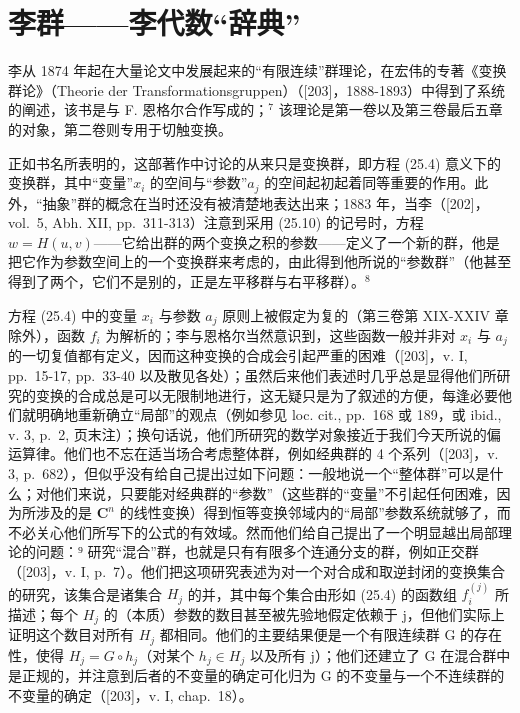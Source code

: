 \section{李群——李代数“辞典”}

李从 1874 年起在大量论文中发展起来的“有限连续”群理论，在宏伟的专著《变换群论》（Theorie der Transformationsgruppen）（{[}203{]}，1888-1893）中得到了系统的阐述，该书是与 F. 恩格尔合作写成的；\(^{7}\) 该理论是第一卷以及第三卷最后五章的对象，第二卷则专用于切触变换。

正如书名所表明的，这部著作中讨论的从来只是变换群，即方程 (25.4) 意义下的变换群，其中“变量”\(x_{i}\) 的空间与“参数”\(a_{j}\) 的空间起初起着同等重要的作用。此外，“抽象”群的概念在当时还没有被清楚地表达出来；1883 年，当李（{[}202{]}，vol.~5, Abh. XII, pp.~311-313）注意到采用 (25.10) 的记号时，方程 \(w = H(u, v)\)——它给出群的两个变换之积的参数——定义了一个新的群，他是把它作为参数空间上的一个变换群来考虑的，由此得到他所说的“参数群”（他甚至得到了两个，它们不是别的，正是左平移群与右平移群）。\(^{8}\)

方程 (25.4) 中的变量 \(x_{i}\) 与参数 \(a_{j}\) 原则上被假定为复的（第三卷第 XIX-XXIV 章除外），函数 \(f_{i}\) 为解析的；李与恩格尔当然意识到，这些函数一般并非对 \(x_{i}\) 与 \(a_{j}\) 的一切复值都有定义，因而这种变换的合成会引起严重的困难（{[}203{]}，v. I, pp.~15-17, pp.~33-40 以及散见各处）；虽然后来他们表述时几乎总是显得他们所研究的变换的合成总是可以无限制地进行，这无疑只是为了叙述的方便，每逢必要他们就明确地重新确立“局部”的观点（例如参见 loc. cit., pp.~168 或 189，或 ibid., v. 3, p.~2, 页末注）；换句话说，他们所研究的数学对象接近于我们今天所说的偏运算律。他们也不忘在适当场合考虑整体群，例如经典群的 4 个系列（{[}203{]}，v. 3, p.~682），但似乎没有给自己提出过如下问题：一般地说一个“整体群”可以是什么；对他们来说，只要能对经典群的“参数”（这些群的“变量”不引起任何困难，因为所涉及的是 \(\mathbf{C}^n\) 的线性变换）得到恒等变换邻域内的“局部”参数系统就够了，而不必关心他们所写下的公式的有效域。然而他们给自己提出了一个明显越出局部理论的问题：⁹ 研究“混合”群，也就是只有有限多个连通分支的群，例如正交群（{[}203{]}，v. I, p.~7）。他们把这项研究表述为对一个对合成和取逆封闭的变换集合的研究，该集合是诸集合 \(H_{j}\) 的并，其中每个集合由形如 (25.4) 的函数组 \(f_{i}^{(j)}\) 所描述；每个 \(H_{j}\) 的（本质）参数的数目甚至被先验地假定依赖于 j，但他们实际上证明这个数目对所有 \(H_{j}\) 都相同。他们的主要结果便是一个有限连续群 G 的存在性，使得 \(H_{j} = G \circ h_{j}\)（对某个 \(h_{j} \in H_{j}\) 以及所有 j）；他们还建立了 G 在混合群中是正规的，并注意到后者的不变量的确定可化归为 G 的不变量与一个不连续群的不变量的确定（{[}203{]}，v. I, chap.~18）。

